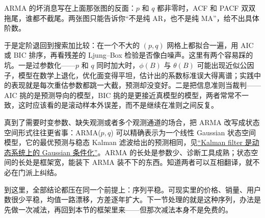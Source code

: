 ARMA 的坏消息写在上面那张图的反面：\(p\) 和 \(q\) 都非零时，ACF 和 PACF 双双拖尾，谁都不截尾。两张图只能告诉你``不是纯 AR，也不是纯 MA''，给不出具体阶数。

于是定阶退回到搜索加比较：在一个不大的 \((p,q)\) 网格上都拟合一遍，用 AIC 或 BIC 排序，再看残差的 Ljung--Box 检验是否像白噪声。这里有两个容易踩的坑。一是过参数化——\(p\) 和 \(q\) 同时加大时，\(\phi(B)\) 与 \(\theta(B)\) 可能出现近似公因子，模型在数学上退化，优化面变得平坦，估计出的系数标准误大得离谱；实践中的表现就是每次重估参数都跳一大截，预测却没变好。二是把信息准则当裁判——AIC 挑的是预测导向的模型，BIC 挑的是更接近真模型的模型，两者常常不一致，这时应该看的是滚动样本外误差，而不是继续在准则之间反复。

真到了需要时变参数、缺失观测或者多个观测通道的场合，把 ARMA 改写成状态空间形式往往更省事：ARMA(\(p,q\)) 可以精确表示为一个线性 Gaussian 状态空间模型，它的最优预测与稳态 Kalman 滤波给出的预测相同，见\hyperref[sec:13-Machine-Learning/07-Graphical-and-Sequential-Models/03]{``Kalman filter 是动态系统上的 Gaussian 条件化''}。ARMA 的长处是参数少、诊断工具成熟；状态空间的长处是框架宽，能装下 ARMA 装不下的东西。知道两者可以互相翻译，就不必在门派上纠结。

到这里，全部结论都压在同一个前提上：序列平稳。可现实里的价格、销量、用户数很少平稳，均值一路漂移，方差逐年扩大。下一节处理的就是这种序列，办法是先做一次减法，再回到本节的框架里来——但那次减法本身不是免费的。
